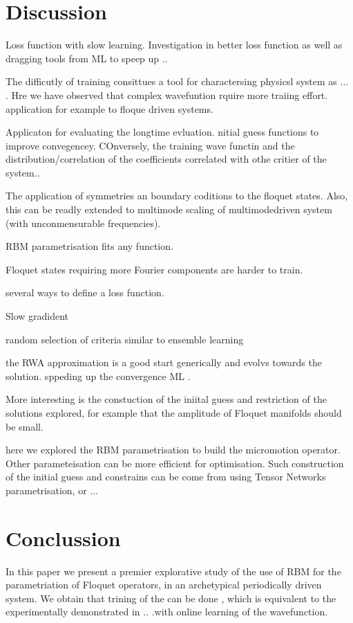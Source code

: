 \documentclass[pra,twocolumn,showkeys,preprintnumbers, amsmath,amssymb, aps,A4paper]{revtex4-1}
\begin{document}
\section{\label{sec:discussion} Discussion}

Loss function with slow learning. Investigation in better loss function as well as dragging tools from ML to speep up .. 

The difficutly of training consittues a tool for charactersing physicsl system as ... . Hre we have observed that complex wavefuntion rquire more traiing effort. application for example to floque driven systems.

Applicaton for evaluating the longtime evluation. nitial guess functions to improve convegencey. COnversely, the training wave functin and the distribution/correlation of the coefficients correlated with othe critier of the system..

The application of symmetries an boundary coditions to the floquet states. Also, this can be readly extended to multimode scaling of multimodedriven system (with unconmensurable frequencies).
 


RBM parametrisation fits any function.

Floquet states requiring more Fourier components are harder to train.

several ways to define a loss function.

Slow gradident

random selection of criteria similar to ensemble learning

the RWA approximation is a good start generically and evolvs towards the solution. sppeding up the  convergence ML .

More interesting is the constuction of the iniital guess and restriction of the solutions explored, for example that the amplitude of Floquet manifolds should be small.

here we explored the RBM parametrisation to build the micromotion operator. Other parameteisation  can be more efficient for optimisation. Such construction of the initial guess and constrains can be come from using Tensor Networks parametrisation, or ... 


\section{Conclussion}
In this paper we present a premier explorative study of the use of RBM for the parametriation of Floquet operators, in an archetypical periodically driven system. We obtain that trining of the can be done , which is equivalent to the experimentally demonstrated in .. .with online learning of the wavefunction.
\end{document}
